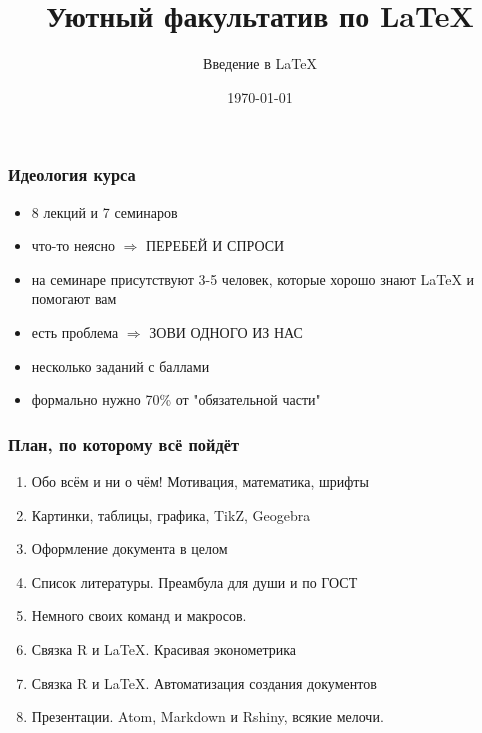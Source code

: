 \documentclass[aspectratio=169,newPxFont]{beamer}
\title{Уютный факультатив по \LaTeX}
\subtitle{Введение в \LaTeX}
\date{\today}
\begin{document}
\begingroup
{}
\begin{frame}[plain]
\begin{center}
\Huge{\color{red}{ВНИМАНИЕ!}}
\end{center}

\begin{center}
\end{center}
\end{frame}
\endgroup

 \maketitle

\begin{frame}
\frametitle{Идеология курса}
\begin{itemize}
\item 8 лекций и 7 семинаров
\item что-то неясно $\Rightarrow$ \alert{ ПЕРЕБЕЙ И СПРОСИ}
\item на семинаре присутствуют 3-5 человек, которые хорошо знают \LaTeX{} и помогают вам
\item есть проблема $\Rightarrow$ \alert{ЗОВИ ОДНОГО ИЗ НАС} 
\item несколько заданий с баллами
\item формально нужно 70\%  от "обязательной части"
\end{itemize}
\end{frame}


\begin{frame}
\frametitle{План, по которому всё пойдёт}
\begin{enumerate}
\item Обо всём и ни о чём! Мотивация, математика, шрифты
\item Картинки, таблицы, графика, TikZ, Geogebra
\item Оформление документа в целом
\item Список литературы.  Преамбула для души и по ГОСТ
\item Немного своих команд и макросов. 
\item Связка R и \LaTeX{}. Красивая эконометрика
\item Связка R и \LaTeX{}. Автоматизация создания документов
\item Презентации. Atom, Markdown и Rshiny,  всякие мелочи.
\end{enumerate}
\end{frame}
\end{document}
